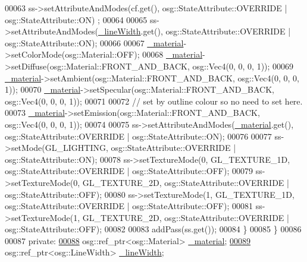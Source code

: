 \begin{DoxyCode}
00063                 ss->setAttributeAndModes(cf.get(), osg::StateAttribute::OVERRIDE | osg::StateAttribute::ON)
      ;
00064 
00065                 ss->setAttributeAndModes(\hyperlink{classbrtr_1_1_cel_shading_technique_a2b943ddfe4db5a92b959217a8321584f}{\_lineWidth}.get(), osg::StateAttribute::OVERRIDE | 
      osg::StateAttribute::ON);
00066 
00067                 \hyperlink{classbrtr_1_1_cel_shading_technique_a266daa43a0effb4989755d61446dc14c}{\_material}->setColorMode(osg::Material::OFF);
00068                 \hyperlink{classbrtr_1_1_cel_shading_technique_a266daa43a0effb4989755d61446dc14c}{\_material}->setDiffuse(osg::Material::FRONT\_AND\_BACK, osg::Vec4(0, 0, 0, 1));
00069                 \hyperlink{classbrtr_1_1_cel_shading_technique_a266daa43a0effb4989755d61446dc14c}{\_material}->setAmbient(osg::Material::FRONT\_AND\_BACK, osg::Vec4(0, 0, 0, 1));
00070                 \hyperlink{classbrtr_1_1_cel_shading_technique_a266daa43a0effb4989755d61446dc14c}{\_material}->setSpecular(osg::Material::FRONT\_AND\_BACK, osg::Vec4(0, 0, 0, 1));
00071 
00072                 \textcolor{comment}{// set by outline colour so no need to set here.}
00073                 \hyperlink{classbrtr_1_1_cel_shading_technique_a266daa43a0effb4989755d61446dc14c}{\_material}->setEmission(osg::Material::FRONT\_AND\_BACK, osg::Vec4(0, 0, 0, 1));
00074 
00075                 ss->setAttributeAndModes(\hyperlink{classbrtr_1_1_cel_shading_technique_a266daa43a0effb4989755d61446dc14c}{\_material}.get(), osg::StateAttribute::OVERRIDE | 
      osg::StateAttribute::ON);
00076 
00077                 ss->setMode(GL\_LIGHTING, osg::StateAttribute::OVERRIDE | osg::StateAttribute::ON);
00078                 ss->setTextureMode(0, GL\_TEXTURE\_1D, osg::StateAttribute::OVERRIDE | 
      osg::StateAttribute::OFF);
00079                 ss->setTextureMode(0, GL\_TEXTURE\_2D, osg::StateAttribute::OVERRIDE | 
      osg::StateAttribute::OFF);
00080                 ss->setTextureMode(1, GL\_TEXTURE\_1D, osg::StateAttribute::OVERRIDE | 
      osg::StateAttribute::OFF);
00081                 ss->setTextureMode(1, GL\_TEXTURE\_2D, osg::StateAttribute::OVERRIDE | 
      osg::StateAttribute::OFF);
00082 
00083                  addPass(ss.get());
00084             \}
00085         \}
00086 
00087     \textcolor{keyword}{private}:
\hypertarget{_cel_shading_8cpp_source_l00088}{}\hyperlink{classbrtr_1_1_cel_shading_technique_a266daa43a0effb4989755d61446dc14c}{00088}         osg::ref\_ptr<osg::Material> \hyperlink{classbrtr_1_1_cel_shading_technique_a266daa43a0effb4989755d61446dc14c}{\_material};
\hypertarget{_cel_shading_8cpp_source_l00089}{}\hyperlink{classbrtr_1_1_cel_shading_technique_a2b943ddfe4db5a92b959217a8321584f}{00089}         osg::ref\_ptr<osg::LineWidth> \hyperlink{classbrtr_1_1_cel_shading_technique_a2b943ddfe4db5a92b959217a8321584f}{\_lineWidth};

\end{DoxyCode}
